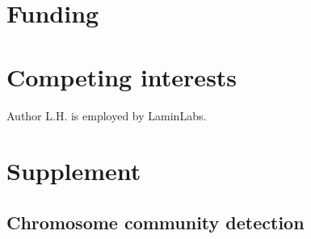 \documentclass{bioinfo}
\theoremstyle{definition}
\newcommand{\beginsupplement}{%
	\setcounter{table}{0}
	\renewcommand{\thetable}{S\arabic{table}}%
	\setcounter{figure}{0}
	\renewcommand{\thefigure}{S\arabic{figure}}%
}
\begin{document}
	
	\section*{Funding}
	
	
	\section*{Competing interests}
	Author L.H. is employed by LaminLabs.
	
%	
		
	
	
	
	
	\clearpage
	\setcounter{page}{1}
	
	\beginsupplement
	
	\section{Supplement}
	
	\subsection{Chromosome community detection}
	
\end{document}

